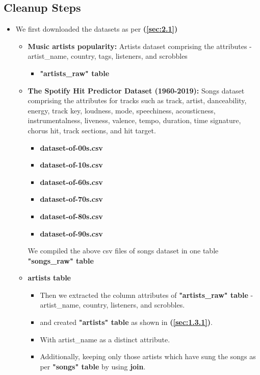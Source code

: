 \documentclass[10pt]{article}
\begin{document}
\subsection{Cleanup Steps}
\begin{itemize}
    \item We first downloaded the datasets as per \textbf{(\autoref{sec:2.1})}
    \begin{itemize}
        \item \textbf{Music artists popularity:} Artists dataset comprising the attributes -  artist\_name, country, tags, listeners, and scrobbles
        \begin{itemize}
            \item \textbf{"artists\_raw" table}
        \end{itemize}
    \item \textbf{The Spotify Hit Predictor Dataset (1960-2019):} Songs dataset comprising the attributes for tracks such as track, artist, danceability,  energy, track key,  loudness,  mode,  speechiness,  acousticness,  instrumentalness, liveness,  valence,  tempo,  duration, time signature, chorus hit, track sections, and hit target.
    \begin{itemize}
            \item \textbf{dataset-of-00s.csv}
            \item \textbf{dataset-of-10s.csv}
            \item \textbf{dataset-of-60s.csv}
            \item \textbf{dataset-of-70s.csv}
            \item \textbf{dataset-of-80s.csv}
            \item \textbf{dataset-of-90s.csv}
    \end{itemize}
    We compiled the above csv files of songs dataset in one table \textbf{"songs\_raw" table}
        
        \item \textbf{artists table} 
        \begin{itemize}
            \item Then we extracted the column attributes of \textbf{"artists\_raw" table} - artist\_name, country, listeners, and scrobbles. 
            \item and created \textbf{"artists" table} as shown in \textbf{(\autoref{sec:1.3.1})}. 
            \item With artist\_name as a distinct attribute. 
            \item Additionally, keeping only those artists which have sung the songs as per \textbf{"songs" table} by using \textbf{join}.    
        \end{itemize}
        

\end{itemize}
\end{itemize}
\end{document}
